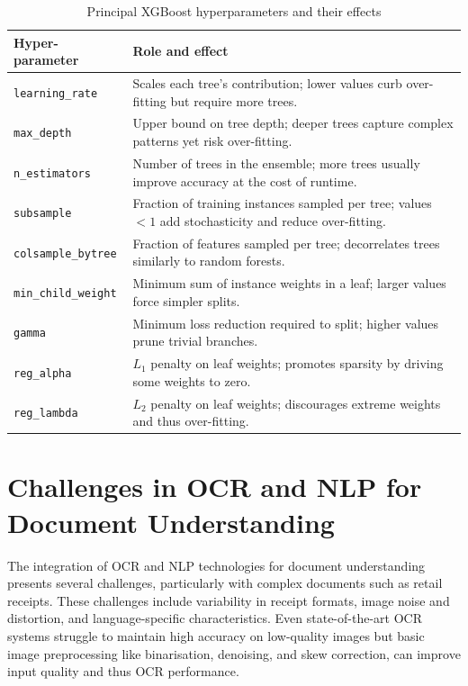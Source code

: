\documentclass{SGGW-thesis-EN}
\begin{document}
\begin{table}[h]
  \centering
  \caption{Principal XGBoost hyperparameters and their effects}\label{tab:xgboost_hyperparameters}
  \begin{tabularx}{\textwidth}{@{}lX@{}}
    \toprule
    \textbf{Hyper-parameter} & \textbf{Role and effect} \\ 
    \midrule
    \texttt{learning\_rate}    & Scales each tree’s contribution; lower values curb over-fitting but require more trees. \\ 
    \texttt{max\_depth}        & Upper bound on tree depth; deeper trees capture complex patterns yet risk over-fitting. \\ 
    \texttt{n\_estimators}     & Number of trees in the ensemble; more trees usually improve accuracy at the cost of runtime. \\ 
    \texttt{subsample}         & Fraction of training instances sampled per tree; values $<1$ add stochasticity and reduce over-fitting. \\ 
    \texttt{colsample\_bytree} & Fraction of features sampled per tree; decorrelates trees similarly to random forests. \\ 
    \texttt{min\_child\_weight} & Minimum sum of instance weights in a leaf; larger values force simpler splits. \\ 
    \texttt{gamma}             & Minimum loss reduction required to split; higher values prune trivial branches. \\ 
    \texttt{reg\_alpha}        & $L_{1}$ penalty on leaf weights; promotes sparsity by driving some weights to zero. \\ 
    \texttt{reg\_lambda}       & $L_{2}$ penalty on leaf weights; discourages extreme weights and thus over-fitting. \\ 
    \bottomrule
  \end{tabularx}
\end{table}


\section{Challenges in OCR and NLP for Document Understanding}

The integration of OCR and NLP technologies for document understanding presents several
challenges, particularly with complex documents such as retail receipts.
These challenges include variability in receipt formats, image noise and distortion, and
language-specific characteristics.
Even state-of-the-art OCR systems struggle to maintain high accuracy on low-quality images but
basic image preprocessing like binarisation, denoising, and skew correction, can improve
input quality and thus OCR performance.
\end{document}
